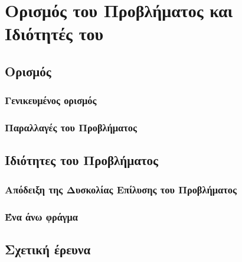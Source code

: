 

\chapter{Ορισμός του Προβλήματος και Ιδιότητές του}
\section{Ορισμός}
\subsection{Γενικευμένος ορισμός}
\subsection{Παραλλαγές του Προβλήματος}

\section{Ιδιότητες του Προβλήματος}
\subsection{Απόδειξη της Δυσκολίας Επίλυσης του Προβλήματος}
\subsection{Ένα άνω φράγμα}

\section{Σχετική έρευνα}